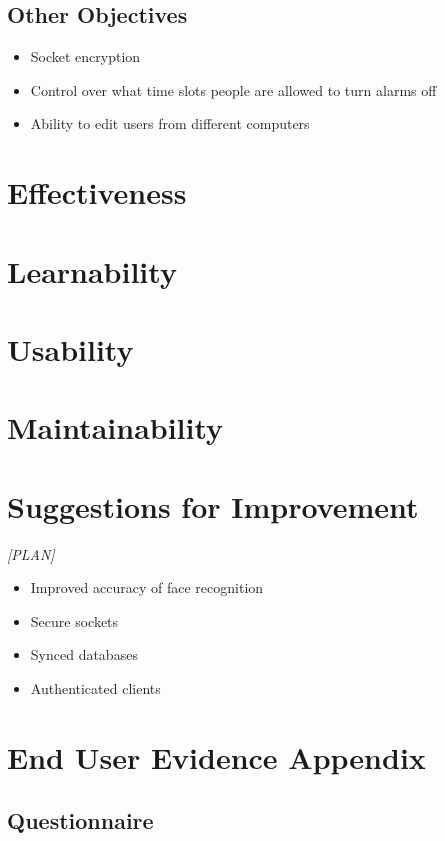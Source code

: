 \documentclass[a4paper]{article}
\begin{document}
	\subsection{Other Objectives}
		
		\begin{itemize}
			\item Socket encryption
			\item Control over what time slots people are allowed to turn alarms off
			\item Ability to edit users from different computers
		\end{itemize}

\section{Effectiveness}

\section{Learnability}

\section{Usability}

\section{Maintainability}

\section{Suggestions for Improvement}

	\textit{[PLAN]}
	\begin{itemize}
		\item Improved accuracy of face recognition
		\item Secure sockets
		\item Synced databases
		\item Authenticated clients 
	\end{itemize}	

\section{End User Evidence Appendix}

	\subsection{Questionnaire}
\end{document}
